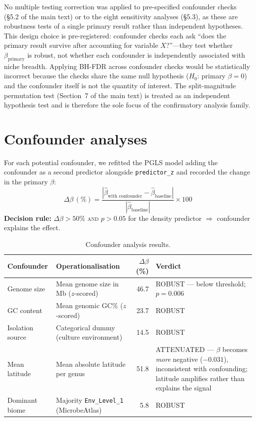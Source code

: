\documentclass[11pt]{article}
\begin{document}
No multiple testing correction was applied to pre-specified confounder checks
(§5.2 of the main text) or to the eight sensitivity analyses (§5.3), as these
are robustness tests of a single primary result rather than independent
hypotheses. This design choice is pre-registered: confounder checks each ask
``does the primary result survive after accounting for variable $X$?''---they
test whether $\beta_\text{primary}$ is robust, not whether each confounder is
independently associated with niche breadth. Applying BH-FDR across confounder
checks would be statistically incorrect because the checks share the same null
hypothesis ($H_0$: primary $\beta = 0$) and the confounder itself is not the
quantity of interest. The split-magnitude permutation test (Section~7 of the
main text) is treated as an independent hypothesis test and is therefore the
sole focus of the confirmatory analysis family.

\section{Confounder analyses}
\label{sm:confounders}

For each potential confounder, we refitted the PGLS model adding the confounder
as a second predictor alongside \texttt{predictor\_z} and recorded the change
in the primary $\beta$:
\begin{equation}
\Delta\beta\,(\%) =
  \frac{|\hat{\beta}_{\text{with confounder}} - \hat{\beta}_{\text{baseline}}|}
       {|\hat{\beta}_{\text{baseline}}|}
  \times 100
\end{equation}
\textbf{Decision rule:} $\Delta\beta > 50\%$ \textsc{and} $p > 0.05$ for the
density predictor $\Rightarrow$ confounder explains the effect.

\begin{table}[H]
\centering
\caption{Confounder analysis results.}
\label{tab:confounders}
\small
\begin{tabular}{p{3.2cm}p{4.5cm}rp{4cm}}
\toprule
Confounder & Operationalisation & $\Delta\beta$ (\%) & Verdict \\
\midrule
Genome size & Mean genome size in Mb ($z$-scored) & 46.7 &
  ROBUST — below threshold; $p = 0.006$ \\
GC content & Mean genomic GC\% ($z$-scored) & 23.7 &
  ROBUST \\
Isolation source & Categorical dummy (culture environment) & 14.5 &
  ROBUST \\
Mean latitude & Mean absolute latitude per genus & 51.8 &
  ATTENUATED — $\beta$ becomes \emph{more} negative ($-0.031$), inconsistent
  with confounding; latitude amplifies rather than explains the signal \\
Dominant biome & Majority \texttt{Env\_Level\_1} (MicrobeAtlas) & 5.8 &
  ROBUST \\
\bottomrule
\end{tabular}
\end{table}
\end{document}

